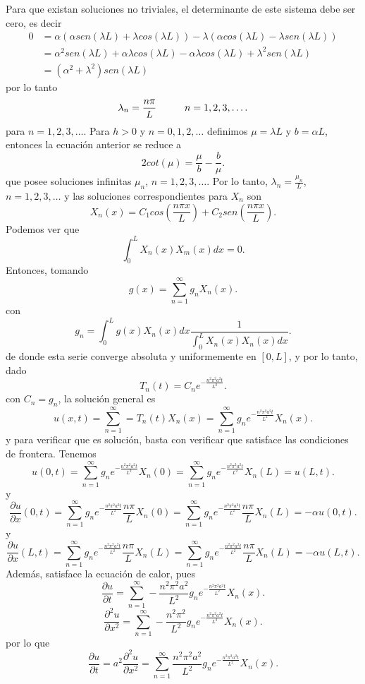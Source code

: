 \documentclass[11pt]{book}
\theoremstyle{plain}
\theoremstyle{definition}
\begin{document}
Para que existan soluciones no triviales, el determinante de este sistema debe ser cero, es decir
\begin{align*}
    0 &=  \alpha \left(\alpha sen(\lambda L) + \lambda cos(\lambda L)\right) - \lambda \left(\alpha cos (\lambda L) - \lambda sen(\lambda L)\right)\\
    &= \alpha^{2}sen(\lambda L) + \alpha \lambda cos(\lambda L) - \alpha \lambda cos(\lambda L) + \lambda^{2}sen(\lambda L)\\
    &= (\alpha^{2} + \lambda^{2})sen(\lambda L)
\end{align*}
por lo tanto
\[
    \lambda_{n} = \frac{n\pi}{L} \hspace{10mm} n = 1,2,3,\dots
.\]
para $n = 1,2,3,\dots$. Para $h > 0$ y $n = 0,1,2,\dots$ definimos $\mu = \lambda L$ y $b = \alpha L$, entonces la ecuación anterior se reduce a
\[
    2cot(\mu) = \frac{\mu}{b} - \frac{b}{\mu}
.\]
que posee soluciones infinitas $\mu_{n}$, $n = 1,2,3,\dots$. Por lo tanto, $\lambda_{n} = \frac{\mu_{n}}{L}$, $n = 1,2,3,\dots$ y las soluciones correspondientes para $X_{n}$ son
\[
    X_{n}(x) = C_{1}cos(\frac{n\pi x}{L}) + C_{2}sen(\frac{n\pi x}{L})
.\]
Podemos ver que 
\[
    \int_{0}^{L} X_{n}(x)X_{m}(x)dx = 0
.\]
Entonces, tomando
\[
    g(x) = \sum_{n=1}^{\infty} g_{n}X_{n}(x)
.\]
con 
\[
    g_{n} = \int_{0}^{L} g(x)X_{n}(x)dx \frac{1}{\int_{0}^{L} X_{n}(x)X_{n}(x)dx}
.\]
de donde esta serie converge absoluta y uniformemente en $[0,L]$, y por lo tanto, dado
\[
    T_{n}(t) = C_{n}e^{-\frac{n^{2}\pi^{2}a^{2}t}{L^{2}}}
.\]
con $C_{n} = g_{n}$, la solución general es
\[
    u(x,t) = \sum_{n=1}^{\infty} = T_{n}(t)X_{n}(x) = \sum_{n=1}^{\infty} g_{n}e^{-\frac{n^{2}\pi^{2}a^{2}t}{L^{2}}}X_{n}(x)
.\]
y para verificar que es solución, basta con verificar que satisface las condiciones de frontera. Tenemos
\[
    u(0,t) = \sum_{n=1}^{\infty} g_{n}e^{-\frac{n^{2}\pi^{2}a^{2}t}{L^{2}}}X_{n}(0) = \sum_{n=1}^{\infty} g_{n}e^{-\frac{n^{2}\pi^{2}a^{2}t}{L^{2}}}X_{n}(L) = u(L,t)
.\]
y
\[
    \frac{\partial u}{\partial x}(0,t) = \sum_{n=1}^{\infty} g_{n}e^{-\frac{n^{2}\pi^{2}a^{2}t}{L^{2}}}\frac{n\pi}{L}X_{n}(0) = \sum_{n=1}^{\infty} g_{n}e^{-\frac{n^{2}\pi^{2}a^{2}t}{L^{2}}}\frac{n\pi}{L}X_{n}(L) = -\alpha u(0,t)
.\]
y
\[
    \frac{\partial u}{\partial x}(L,t) = \sum_{n=1}^{\infty} g_{n}e^{-\frac{n^{2}\pi^{2}a^{2}t}{L^{2}}}\frac{n\pi}{L}X_{n}(L) = \sum_{n=1}^{\infty} g_{n}e^{-\frac{n^{2}\pi^{2}a^{2}t}{L^{2}}}\frac{n\pi}{L}X_{n}(L) = -\alpha u(L,t)
.\]
Además, satisface la ecuación de calor, pues
\[
    \frac{\partial u}{\partial t} = \sum_{n=1}^{\infty} -\frac{n^{2}\pi^{2}a^{2}}{L^{2}}g_{n}e^{-\frac{n^{2}\pi^{2}a^{2}t}{L^{2}}}X_{n}(x)
.\]
\[
    \frac{\partial^2 u}{\partial x^2} = \sum_{n=1}^{\infty} -\frac{n^{2}\pi^{2}}{L^{2}}g_{n}e^{-\frac{n^{2}\pi^{2}a^{2}t}{L^{2}}}X_{n}(x)
.\]
por lo que
\[
    \frac{\partial u}{\partial t} = a^{2} \frac{\partial^2 u}{\partial x^2} = \sum_{n=1}^{\infty} \frac{n^{2}\pi^{2}a^{2}}{L^{2}}g_{n}e^{-\frac{n^{2}\pi^{2}a^{2}t}{L^{2}}}X_{n}(x)
.\]
\end{document}
